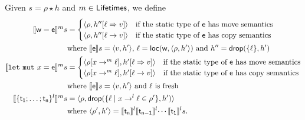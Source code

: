 \begin{definition}\label{def:semantics_terms}
  Given $s=\rho\star h$ and $m\in\Lifetimes$, we define
  \begin{align*}
    \denl[\mathsf{w}=\mathsf{e}]{m}{s}&=
    \begin{cases}
      \langle\rho,h''[\ell\Rightarrow v]\rangle & \text{if the static type of $\mathsf{e}$ has move semantics}\\
      \langle\rho,h''[\ell\to v]\rangle & \text{if the static type of $\mathsf{e}$ has copy semantics}
    \end{cases}\\
    &\text{where $\den[\mathsf{e}]{s}=\langle v,h'\rangle$, $\ell=\loc(\mathsf{w},\langle\rho,h'\rangle)$ and
      $h''=\drop(\{\ell\},h')$}\\
    \denl[\mathtt{let\ mut}\ x=\mathsf{e}]{m}{s}&=
    \begin{cases}
      \langle\rho[x\to^m\ell],h'[\ell\Rightarrow v]\rangle & \text{if the static type of $\mathsf{e}$ has move semantics}\\
      \langle\rho[x\to^m\ell],h'[\ell\to v]\rangle & \text{if the static type of $\mathsf{e}$ has copy semantics}
    \end{cases}\\
    &\text{where $\den[\mathsf{e}]{s}=\langle v,h'\rangle$ and $\ell$ is fresh}\\
    \denl[\{\mathsf{t_1};\ldots;\mathsf{t_n}\}^l]{m}{s}&=\langle\rho,\drop(\{\ell\mid x\to^l\ell\in\rho'\},h')\rangle\\
    &\text{where $\langle\rho',h'\rangle=\denl[\mathsf{t_n}]{l}{\denl[\mathsf{t_{n-1}}]{l}{\cdots\denl[\mathsf{t_1}]{l}{s}}}$.}
  \end{align*}
\end{definition}

